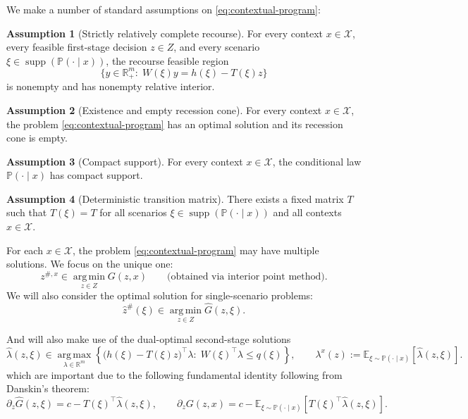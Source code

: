 \documentclass{article}
\newcommand{\R}{\mathbb{R}}
\newcommand{\E}{\mathbb{E}}
\newcommand{\argmin}{\operatorname*{arg\,min}}
\newcommand{\argmax}{\operatorname*{arg\,max}}
\theoremstyle{plain}
\theoremstyle{definition}
\newtheorem{assumption}{Assumption}
\theoremstyle{remark}
\begin{document}
We make a number of standard assumptions on \eqref{eq:contextual-program}:
\begin{assumption}[Strictly relatively complete recourse]
\label{ass:strict-recourse}
For every context $x\in\mathcal X$, every feasible first-stage decision $z\in Z$, and every scenario
$\xi\in\operatorname{supp}(\mathbb P(\cdot\mid x))$, the recourse feasible region
\[
\{y\in\R^{m}_+:\;W(\xi)y=h(\xi)-T(\xi)z\}
\]
is nonempty and has nonempty relative interior.
\end{assumption}

\begin{assumption}[Existence and empty recession cone]
\label{ass:context-existence}
For every context $x\in\mathcal X$, the problem \eqref{eq:contextual-program} has an optimal solution and its
recession cone is empty.
\end{assumption}

\begin{assumption}[Compact support]
\label{ass:compact-support}
For every context $x\in\mathcal X$, the conditional law $\mathbb P(\cdot\mid x)$ has compact support.
\end{assumption}

\begin{assumption}[Deterministic transition matrix]
\label{ass:contextual-T-deterministic}
There exists a fixed matrix $T$ such that $T(\xi)=T$ for all scenarios $\xi\in\operatorname{supp}(\mathbb P(\cdot\mid x))$ and all contexts $x\in\mathcal X$.
\end{assumption}

For each $x\in\mathcal X$, the problem \eqref{eq:contextual-program} may have multiple solutions. We focus on
the unique one:
\begin{equation}
\label{eq:canonical-contextual-solution}
z^{\#,x}\in\argmin_{z\in Z}G(z,x)\qquad \text{(obtained via interior point method)}.
\end{equation}
We will also consider the optimal solution for single-scenario problems:
\begin{equation}
\label{eq:canonical-single-scenario}
\hat z^{\#}(\xi)\in\argmin_{z\in Z}\hat G(z,\xi).
\end{equation}

And will also make use of the dual-optimal second-stage solutions
\begin{equation}
\label{eq:contextual-dual}
\hat\lambda(z,\xi)\in
\argmax_{\lambda\in\R^{m}}
\left\{
\big(h(\xi)-T(\xi)z\big)^\top\lambda:\;W(\xi)^\top\lambda\le q(\xi)
\right\},
\qquad
\lambda^x(z):=\E_{\xi\sim\mathbb P(\cdot\mid x)}\!\left[\hat\lambda(z,\xi)\right].
\end{equation}
which are important due to the following fundamental identity following from Danskin's theorem:
\begin{equation}
\label{eq:danskin-contextual}
\partial_z \hat G(z,\xi)=c-T(\xi)^\top\hat\lambda(z,\xi),
\qquad
\partial_z G(z,x)=c-\E_{\xi\sim\mathbb P(\cdot\mid x)}\!\left[T(\xi)^\top\hat\lambda(z,\xi)\right].
\end{equation}
\end{document}
